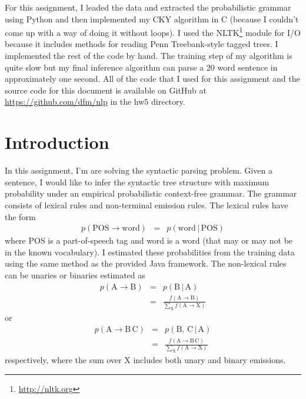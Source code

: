 \documentclass[11pt]{article}
\newcommand{\code}[1]{{\sffamily #1}}
\begin{document}
For this assignment, I leaded the data and extracted the probabilistic grammar
using Python and then implemented my CKY algorithm in C (because I couldn't
come up with a way of doing it without loops).
I used the NLTK\footnote{\url{http://nltk.org}} module for I/O because it
includes methods for reading Penn Treebank-style tagged trees.
I implemented the rest of the code by hand.
The training step of my algorithm is quite slow but my final inference
algorithm can parse a 20 word sentence in approximately one second.
All of the code that I used for this assignment and the source code for this
document is available on GitHub at \url{https://github.com/dfm/nlp} in the
\code{hw5} directory.

\section{Introduction}

In this assignment, I'm are solving the syntactic parsing problem.
Given a sentence, I would like to infer the syntactic tree structure with
maximum probability under an empirical probabilistic context-free grammar.
The grammar consists of lexical rules and non-terminal emission rules.
The lexical rules have the form
\begin{eqnarray}
p(\mathrm{POS} \to \mathrm{word}) &=& p(\mathrm{word}\,|\,\mathrm{POS})
\end{eqnarray}
where \code{POS} is a part-of-speech tag and \code{word} is a word (that may
or may not be in the known vocabulary).
I estimated these probabilities from the training data using the same method
as the provided Java framework.
The non-lexical rules can be unaries or binaries estimated as
\begin{eqnarray}
p(\mathrm{A} \to \mathrm{B}) &=& p(\mathrm{B}\,|\,\mathrm{A}) \\
                             &=& \frac{f(\mathrm{A}\to\mathrm{B})}
                                 {\sum_\mathrm{X} f(\mathrm{A}\to\mathrm{X})}
\end{eqnarray}
or
\begin{eqnarray}
p(\mathrm{A} \to \mathrm{B\,C}) &=& p(\mathrm{B},\,\mathrm{C}\,|\,\mathrm{A}) \\
                                &=& \frac{f(\mathrm{A}\to\mathrm{B\,C})}
                                    {\sum_\mathrm{X} f(\mathrm{A}\to\mathrm{X})}
\end{eqnarray}
respectively, where the sum over X includes both unary and binary emissions.
\end{document}
